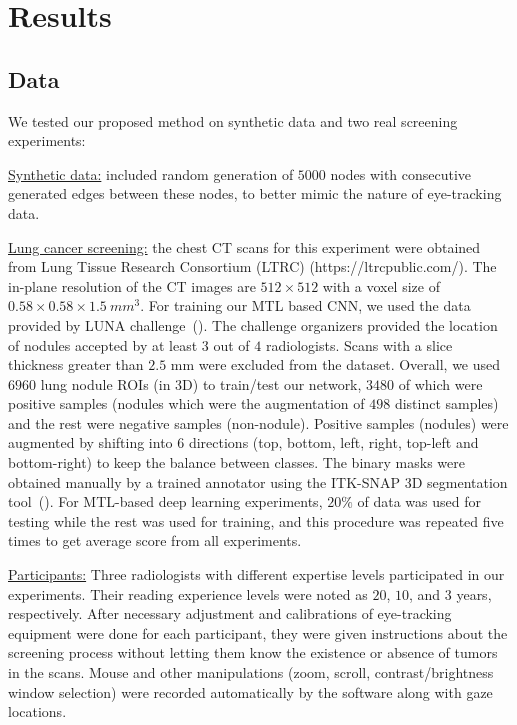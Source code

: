\documentclass[preprint,12pt]{elsarticle}
\begin{document}
\section{Results}
\subsection{Data}
We tested our proposed method on synthetic data and two real screening experiments:


\underline{Synthetic data:} included random generation of $5000$ nodes with consecutive generated edges between these nodes, to better mimic the nature of eye-tracking data.


\underline{Lung cancer screening:} the chest CT scans for this experiment were obtained from  Lung Tissue Research Consortium (LTRC) (https://ltrcpublic.com/). The in-plane resolution of the CT images are $512\times 512$ with a voxel size of $0.58\times 0.58\times 1.5~mm^{3}$. For training our MTL based CNN, we used the data provided by LUNA challenge~(\cite{LUNA16}). The challenge organizers provided the location of nodules accepted by at least $3$ out of $4$ radiologists. Scans with a slice thickness greater than $2.5$ mm were excluded from the dataset. Overall, we used $6960$ lung nodule ROIs (in 3D) to train/test our network, $3480$ of which were positive samples (nodules which were the augmentation of $498$ distinct samples) and the rest were negative samples (non-nodule). Positive samples (nodules) were augmented by shifting into $6$ directions (top, bottom, left, right, top-left and bottom-right) to keep the balance between classes. The binary masks were obtained manually by a trained annotator using the ITK-SNAP 3D segmentation tool~(\cite{yushkevich2016itk}). For MTL-based deep learning experiments, $20\%$ of data was used for testing while the rest was used for training, and this procedure was repeated five times to get average score from all experiments.


\underline{Participants:} Three radiologists with different expertise levels participated in our experiments. Their reading experience levels were noted as $20$, $10$, and $3$ years, respectively. After necessary adjustment and calibrations of eye-tracking equipment were done for each participant, they were given instructions about the screening process without letting them know the existence or absence of tumors in the scans. Mouse and other manipulations (zoom, scroll, contrast/brightness window selection) were recorded automatically by the software along with gaze locations.
\end{document}
